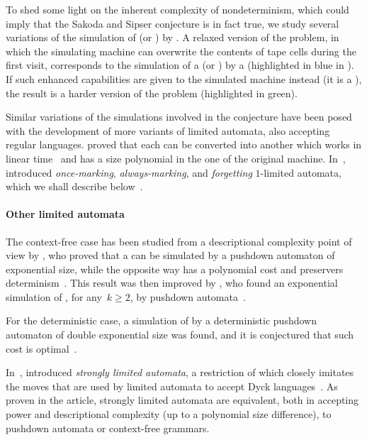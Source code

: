 To shed some light on the inherent complexity of nondeterminism, which could imply that the Sakoda and Sipser conjecture is in fact true, we study several variations of the simulation of \TNFA (or \ONFA) by \TDFA.
A relaxed version of the problem, in which the simulating machine can overwrite the contents of tape cells during the first visit, corresponds to the simulation of a \TNFA (or \ONFA) by a \ODLA (highlighted in blue in ).
If such enhanced capabilities are given to the simulated machine instead (\ie it is a \OLA), the result is a harder version of the problem (highlighted in green).

Similar variations of the simulations involved in the conjecture have been posed with the development of more variants of limited automata, also accepting regular languages.
\citeauthor{GuiPri19} proved that each \OLA can be converted into another \OLA which works in linear time~\cite{GuiPri19} and has a size polynomial in the one of the original machine.
In~\citeyear{PigPri23a}, \citeauthor{PigPri23a} introduced \emph{once-marking}, \emph{always-marking}, and \emph{forgetting} $1$-limited automata, which we shall describe below~\cite{PigPri23a,PigPri23}.


\paragraph{Other limited automata}
The context-free case has been studied from a descriptional complexity point of view by \citeauthor{PigPis15}, who proved that a  can be simulated by a pushdown automaton of exponential size, while the opposite way has a polynomial cost and preservers determinism~\cite{PigPis15}.
\easteregg{\nocite{Ada79}} %
This result was then improved by \citeauthor{KutPig+18}, who found an exponential simulation of \kLAs, for any~$k\ge2$, by pushdown automata~\cite{KutPig+18}.

For the deterministic case, a simulation of  by a deterministic pushdown automaton of double exponential size was found, and it is conjectured that such cost is optimal~\cite{PigPis15}.

In~\citeyear{Pig16}, \citeauthor{Pig16} introduced \emph{strongly limited automata}, a restriction of  which closely imitates the moves that are used by limited automata to accept Dyck languages~\cite{Pig16}.
As proven in the article, strongly limited automata are equivalent, both in accepting power and descriptional complexity (up to a polynomial size difference), to pushdown automata or context-free grammars.

